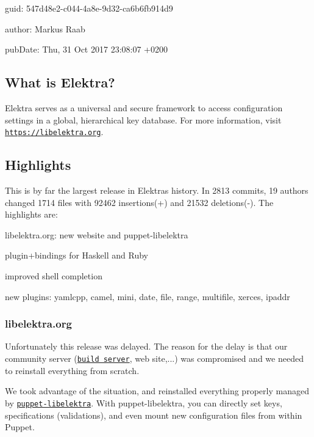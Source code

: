 
\begin{DoxyItemize}
\item guid\+: 547d48e2-\/c044-\/4a8e-\/9d32-\/ca6b6fb914d9
\item author\+: Markus Raab
\item pub\+Date\+: Thu, 31 Oct 2017 23\+:08\+:07 +0200
\end{DoxyItemize}

\subsection*{What is Elektra?}

Elektra serves as a universal and secure framework to access configuration settings in a global, hierarchical key database. For more information, visit \href{https://libelektra.org}{\tt https\+://libelektra.\+org}.

\subsection*{Highlights}

This is by far the largest release in Elektra\textquotesingle{}s history. In 2813 commits, 19 authors changed 1714 files with 92462 insertions(+) and 21532 deletions(-\/). The highlights are\+:


\begin{DoxyItemize}
\item libelektra.\+org\+: new website and puppet-\/libelektra
\item plugin+bindings for Haskell and Ruby
\item improved shell completion
\item new plugins\+: yamlcpp, camel, mini, date, file, range, multifile, xerces, ipaddr
\end{DoxyItemize}

\subsubsection*{libelektra.\+org}

Unfortunately this release was delayed. The reason for the delay is that our community server (\href{https://build.libelektra.org}{\tt build server}, web site,...) was compromised and we needed to reinstall everything from scratch.

We took advantage of the situation, and reinstalled everything properly managed by \href{https://github.com/ElektraInitiative/puppet-libelektra}{\tt puppet-\/libelektra}. With puppet-\/libelektra, you can directly set keys, specifications (validations), and even mount new configuration files from within Puppet.


